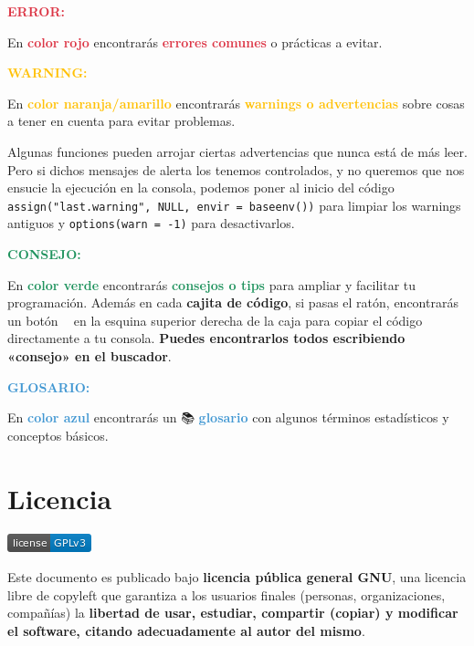 \documentclass[11pt,]{book}
\begin{document}
\textbf{\textcolor{#dc3545}{ERROR:}}

En \textbf{\textcolor{#dc3545}{color rojo}} encontrarás \textbf{\textcolor{#dc3545}{errores comunes}} o prácticas a evitar.

\textbf{\textcolor{#ffc107}{WARNING:}}

En \textbf{\textcolor{#ffc107}{color naranja/amarillo}} encontrarás \textbf{\textcolor{#ffc107}{warnings o advertencias}} sobre cosas a tener en cuenta para evitar problemas.

Algunas funciones pueden arrojar ciertas advertencias que nunca está de más leer. Pero si dichos mensajes de alerta los tenemos controlados, y no queremos que nos ensucie la ejecución en la consola, podemos poner al inicio del código \texttt{assign("last.warning",\ NULL,\ envir\ =\ baseenv())} para limpiar los warnings antiguos y \texttt{options(warn\ =\ -1)} para desactivarlos.

\textbf{\textcolor{#20935E}{CONSEJO:}}

En \textbf{\textcolor{#20935E}{color verde}} encontrarás \textbf{\textcolor{#20935E}{consejos o tips}} para ampliar y facilitar tu programación. Además en cada \textbf{cajita de código}, si pasas el ratón, encontrarás un botón 📄📄 en la esquina superior derecha de la caja para copiar el código directamente a tu consola. \textbf{Puedes encontrarlos todos escribiendo «consejo» en el buscador}.

\textbf{\textcolor{#4197D2}{GLOSARIO:}}

En \textbf{\textcolor{#4197D2}{color azul}} encontrarás un 📚 \textbf{\textcolor{#4197D2}{glosario}} con algunos términos estadísticos y conceptos básicos.

\hypertarget{licencia}{%
\section*{Licencia}\label{licencia}}


\href{https://www.gnu.org/licenses/gpl-3.0}{\includegraphics{img/license-GPLv3-blue.png}}

Este documento es publicado bajo \textbf{licencia pública general GNU}, una licencia libre de copyleft que garantiza a los usuarios finales (personas, organizaciones, compañías) la \textbf{libertad de usar, estudiar, compartir (copiar) y modificar el software, citando adecuadamente al autor del mismo}.
\end{document}
